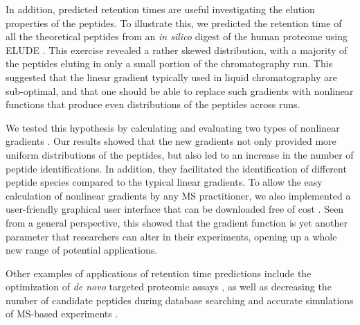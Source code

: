 \documentclass[a4paper]{article}
\begin{document}
In addition, predicted retention times are useful investigating
the elution properties of the peptides.  To illustrate this, we predicted the retention time of all the
theoretical peptides from an {\it in silico} digest of the human
proteome using  {\sc ELUDE}  \cite{elude1}. This exercise revealed a rather skewed
distribution, with a majority of the peptides eluting in only a small
portion of the chromatography run. This suggested that
the linear gradient typically used in liquid chromatography are sub-optimal, and that one should be able to replace such gradients with nonlinear functions that produce even
distributions of the peptides across runs.




We tested this hypothesis by calculating and evaluating
two types of nonlinear gradients \cite{gradopt1}. Our results showed that the new
gradients not only provided more uniform distributions of the
peptides, but also led to an increase in the number of peptide
identifications. In addition, they facilitated the identification of
different peptide species compared to the typical linear gradients. To allow the easy calculation of nonlinear gradients by any MS practitioner, we also implemented a user-friendly graphical user interface that can be downloaded free of cost \cite{gradopt2}. 
Seen from a general perspective, this showed that the gradient function is yet another parameter that researchers can alter
in their experiments, opening up a whole new range of potential
applications. 




Other examples of applications of retention time predictions include the optimization of  {\em de novo} targeted proteomic
assays \cite{bertsch2010}, as well as decreasing the
number of candidate peptides during database
searching \cite{lobas2013} and accurate simulations of MS-based
experiments \cite{bielow2011}.



 
\end{document}
